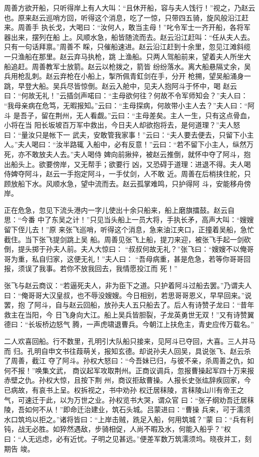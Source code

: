周善方欲开船，只听得岸上有人大叫：“且休开船，容与夫人饯行！”视之，乃赵云
也。原来赵云巡哨方回，听得这个消息，吃了一惊，只带四五骑，旋风般沿江赶来。周善手
执长戈，大喝曰：“汝何人，敢当主母！”叱令军士一齐开船，各将军器出来，摆列在船
上。风顺水急，船皆随流而去。赵云沿江赶叫：“任从夫人去。只有一句话拜禀。”周善不
睬，只催船速进。赵云沿江赶到十余里，忽见江滩斜缆一只渔船在那里。赵云弃马执枪，跳
上渔船。只两人驾船前来，望着夫人所坐大船追赶。周善教军士放箭。赵云以枪拨之，箭皆
纷纷落水。离大船悬隔丈余，吴兵用枪乱刺。赵云弃枪在小船上，掣所佩青釭剑在手，分开
枪搠，望吴船涌身一跳，早登大船。吴兵尽皆惊倒。赵云入舱中，见夫人抱阿斗于怀中，喝
赵云曰：“何故无礼！”云插剑声喏曰：“主母欲何往？何故不令军师知会？”夫人曰：
“我母亲病在危笃，无暇报知。”云曰：“主母探病，何故带小主人去？”夫人曰：“阿斗
是吾子，留在荆州，无人看觑。”云曰：“主母差矣。主人一生，只有这点骨血，小将在当
阳长坂坡百万军中救出，今日夫人却欲抱将去，是何道理？”夫人怒曰：“量汝只是帐下一
武夫，安敢管我家事！”云曰：“夫人要去便去，只留下小主人。”夫人喝曰：“汝半路辄
入船中，必有反意！”云曰：“若不留下小主人，纵然万死，亦不敢放夫人去。”夫人喝侍
婢向前揪捽，被赵云推倒，就怀中夺了阿斗，抱出船头上。欲要傍岸，又无帮手；欲要行
凶，又恐碍于道理：进退不得。夫人喝侍婢夺阿斗，赵云一手抱定阿斗，一手仗剑，人不敢
近。周善在后梢挟住舵，只顾放船下水。风顺水急，望中流而去。赵云孤掌难鸣，只护得阿
斗，安能移舟傍岸。

正在危急，忽见下流头港内一字儿使出十余只船来，船上磨旗擂鼓。赵云自思：“今番
中了东吴之计！”只见当头船上一员大将，手执长矛，高声大叫：“嫂嫂留下侄儿去！”原
来张飞巡哨，听得这个消息，急来油江夹口，正撞着吴船，急忙截住。当下张飞提剑跳上吴
船。周善见张飞上船，提刀来迎，被张飞手起一剑砍倒，提头掷于孙夫人前。夫人大惊曰：
“叔叔何故无礼？”张飞曰：“嫂嫂不以俺哥哥为重，私自归家，这便无礼！”夫人曰：
“吾母病重，甚是危急，若等你哥哥回报，须误了我事。若你不放我回去，我情愿投江而
死！”

张飞与赵云商议：“若逼死夫人，非为臣下之道。只护着阿斗过船去罢。”乃谓夫人
曰：“俺哥哥大汉皇叔，也不辱没嫂嫂。今日相别，若思哥哥恩义，早早回来。”说罢，抱
了阿斗，自与赵云回船，放孙夫人五只船去了。后人有诗赞子龙曰：“昔年救主在当阳，今
日飞身向大江。船上吴兵皆胆裂，子龙英勇世无双！”又有诗赞翼德曰：“长坂桥边怒气
腾，一声虎啸退曹兵。今朝江上扶危主，青史应传万载名。”

二人欢喜回船。行不数里，孔明引大队船只接来，见阿斗已夺回，大喜。三人并马而
归。孔明自申文书往葭萌关，报知玄德。却说孙夫人回吴，具说张飞、赵云杀了周善，截江
夺了阿斗。孙权大怒曰：“今吾妹已归，与彼不亲，杀周善之仇，如何不报！”唤集文武，
商议起军攻取荆州。正商议调兵，忽报曹操起军四十万来报赤壁之仇。孙权大惊，且按下荆
州，商议拒敌曹操。人报长史张纮辞疾回家，今已病故，有哀书上呈。权拆视之，书中劝孙
权迁居秣陵，言秣陵山川有帝王之气，可速迁于此，以为万世之业。孙权览书大哭，谓众官
曰：“张子纲劝吾迁居秣陵，吾如何不从！”即命迁治建业，筑石头城。吕蒙进曰：“曹操
兵来，可于濡须水口筑坞以拒之。”诸将皆曰：“上岸击贼，跣足入船，何用筑城？”蒙
曰：“兵有利钝，战无必胜。如猝然遇敌，步骑相促，人尚不暇及水，何能入船乎？”权
曰：“人无远虑，必有近忧。子明之见甚远。”便差军数万筑濡须坞。晓夜并工，刻期告
竣。


